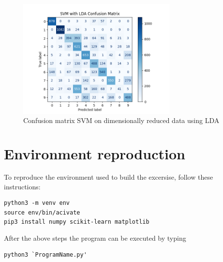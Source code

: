 \documentclass{article}
\begin{document}
\begin{figure}[H]
      \includegraphics[width=8cm]{assets/figure3.png}
      \centering
      \caption{Confusion matrix SVM on dimensionally reduced data using LDA}
\end{figure}

\section {Environment reproduction}
To reproduce the environment used to build the excersise, follow these instructions:

\begin{verbatim}
python3 -m venv env
source env/bin/acivate
pip3 install numpy scikit-learn matplotlib
\end{verbatim}

After the above steps the program can be executed by typing

\begin{verbatim}
python3 `ProgramName.py'
\end{verbatim}



\end{document}
